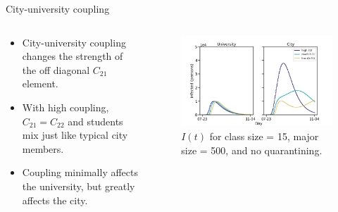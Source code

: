 \documentclass[aspectratio=169]{beamer}
\begin{document}
\begin{frame}{City-university coupling}
    \vfill
    \begin{columns}
    \begin{column}{.3\textwidth}
        \begin{itemize}
            \item City-university coupling changes the strength of the off diagonal $C_{21}$ element.
            \item With high coupling, $C_{21}=C_{22}$ and students mix just like typical city members.
            \item Coupling minimally affects the university, but greatly affects the city.
        \end{itemize}
    \end{column}
    \begin{column}{.7\textwidth}
        \begin{figure}[H]
            \centering
            \includegraphics[width=\textwidth]{figures/city_university_coupling.png}
            \caption{$I(t)$ for class size = 15, major size = 500, and no quarantining.}
        \end{figure}
    \end{column}
    \end{columns}
    \vfill
\end{frame}
\end{document}
